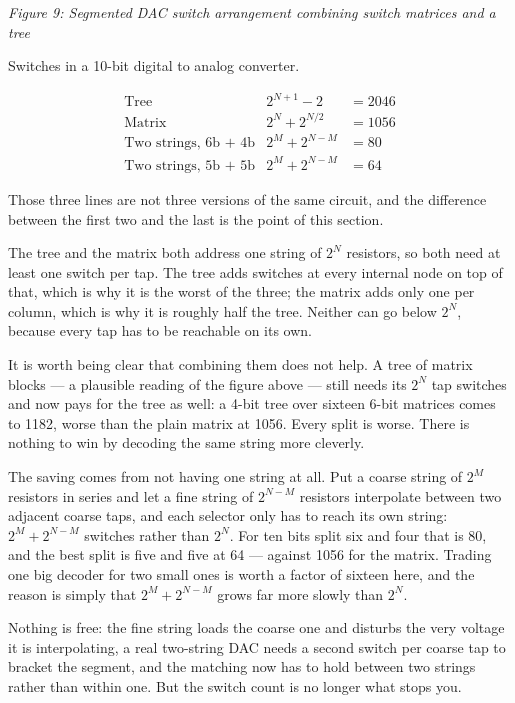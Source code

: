 \emph{Figure 9: Segmented DAC switch arrangement combining switch
matrices and a tree}

Switches in a 10-bit digital to analog converter.

\[
\begin{array}{lll}
\text{Tree} & 2^{N+1}-2 & = 2046 \\
\text{Matrix} & 2^{N}  + 2^{N/2}  & = 1056 \\
\text{Two strings, 6b + 4b} & 2^{M} + 2^{N-M} & = 80 \\
\text{Two strings, 5b + 5b} & 2^{M} + 2^{N-M} & = 64
\end{array}
\]

Those three lines are not three versions of the same circuit, and the
difference between the first two and the last is the point of this
section.

The tree and the matrix both address one string of \(2^N\) resistors, so
both need at least one switch per tap. The tree adds switches at every
internal node on top of that, which is why it is the worst of the three;
the matrix adds only one per column, which is why it is roughly half the
tree. Neither can go below \(2^N\), because every tap has to be
reachable on its own.

It is worth being clear that combining them does not help. A tree of
matrix blocks --- a plausible reading of the figure above --- still
needs its \(2^N\) tap switches and now pays for the tree as well: a
4-bit tree over sixteen 6-bit matrices comes to 1182, worse than the
plain matrix at 1056. Every split is worse. There is nothing to win by
decoding the same string more cleverly.

The saving comes from not having one string at all. Put a coarse string
of \(2^M\) resistors in series and let a fine string of \(2^{N-M}\)
resistors interpolate between two adjacent coarse taps, and each
selector only has to reach its own string: \(2^M + 2^{N-M}\) switches
rather than \(2^N\). For ten bits split six and four that is 80, and the
best split is five and five at 64 --- against 1056 for the matrix.
Trading one big decoder for two small ones is worth a factor of sixteen
here, and the reason is simply that \(2^M + 2^{N-M}\) grows far more
slowly than \(2^N\).

Nothing is free: the fine string loads the coarse one and disturbs the
very voltage it is interpolating, a real two-string DAC needs a second
switch per coarse tap to bracket the segment, and the matching now has
to hold between two strings rather than within one. But the switch count
is no longer what stops you.

